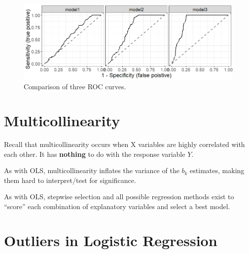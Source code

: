 \documentclass[12pt]{../notes}
\begin{document}

\begin{figure}[H]
\centering
\includegraphics[width = \textwidth]{../figures/module5/roc_curves.png}
\caption{Comparison of three ROC curves.}
\label{fig:ROC}
\end{figure}


\begin{minipage}[l][2cm][c]{\textwidth}
\end{minipage}

 
\section{Multicollinearity}
Recall that multicollinearity occurs when X variables are highly correlated with each other. It has \textbf{nothing} to do with the response variable $Y.$

\nspace
As with OLS, multicollinearity inflates the variance of the $b_k$ estimates, making them hard to interpret/test for significance.

\nspace
As with OLS, stepwise selection and all possible regression methods exist to ``score'' each combination of explanatory variables and select a best model. 



\section{Outliers in Logistic Regression}

\begin{minipage}[l][2cm][c]{\textwidth}
\end{minipage}
\end{document}
